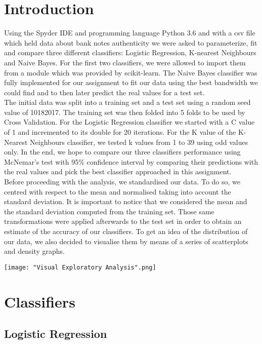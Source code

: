\documentclass[a4paper]{article}
\begin{document}
\section{Introduction}
Using the Spyder IDE and programming language Python 3.6 and with a csv file which held data about bank notes authenticity 
we were asked to parameterize, fit and compare three different classifiers: Logistic Regression, K-nearest Neighbours and Naive Bayes. 
For the first two classifiers, we were allowed to import them from a module which was provided by scikit-learn. 
The Naive Bayes classifier was fully implemented for our assignment to fit our data using the best bandwidth we could find and to then later predict the real values
for a test set.\\
The initial data was split into a training set and a test set using a random seed value of 10182017. 
The training set was then folded into 5 folds to be used by Cross Validation.
For the Logistic Regression classifier we started with a C value of 1 and incremented to its double for 20 iterations.
For the K value of the K-Nearest Neighbours classifier, we tested k values from 1 to 39 using odd values only. 
In the end, we hope to compare our three classifiers performance using McNemar's test with 95\%  confidence interval 
by comparing their predictions with the real values and pick the best classifier approached in this assignment.\\
Before proceeding with the analysis, we standardised our data. To do so, we centred with respect to the mean and normalised 
taking into account the standard deviation. It is important to notice that we considered the mean and the standard deviation computed
 from the training set. Those same transformations were applied afterwards to the test set in order to obtain an estimate of the accuracy 
of our classifiers. To get an idea of the distribution of our data, we also decided to visualise them by means of a series of scatterplots and density graphs. 

\begin{center}
\texttt{[image: "Visual Exploratory Analysis".png]}
\end{center}

\section{Classifiers}

\subsection{Logistic Regression}
\end{document}
